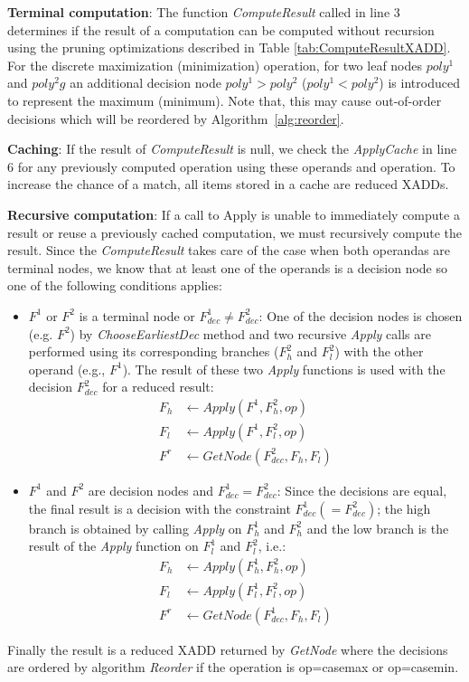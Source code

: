 \documentclass[twoside,11pt]{article}
\begin{document}
\textbf{Terminal computation}: 
The function \emph{ComputeResult} called in line 3 determines if the result of a computation can be computed without recursion using the pruning optimizations described in Table \ref{tab:ComputeResultXADD}. For the discrete maximization (minimization) operation, for two leaf nodes $poly^1$ and $poly^2g$ an additional decision node $poly^1 > poly^2$ ($poly^1 < poly^2$) is introduced to represent the maximum (minimum). Note that, this may cause out-of-order decisions which will be reordered by Algorithm~\ref{alg:reorder}. 

\textbf{Caching}:
If the result of \emph{ComputeResult} is null, we check the \emph{ApplyCache} in line 6 for any previously computed operation using these operands and operation. To increase the chance of a match, all items stored in a cache are reduced XADDs.

\textbf{Recursive computation}:
If a call to Apply is unable to immediately compute a result or reuse a previously cached computation, we must recursively compute the result. Since the \emph{ComputeResult} takes care of the case when both operandas are terminal nodes, we know that at least one of the operands is a decision node so one of the following conditions applies: 
\begin{itemize}
\item $F^1$ or $F^2$ is a terminal node or $\mathit{F^1_{dec}}\neq \mathit{F^2_{dec}} $: One of the decision nodes is chosen (e.g. $F^2$) by 
\emph{ChooseEarliestDec} method and two recursive \emph{Apply} calls are performed using its corresponding branches ($F^2_{h}$ and 
$F^2_{l}$) with the other operand (e.g., $F^1$).
The result of these two \emph{Apply} functions is used with the decision $\mathit{F^2_{dec}}$ for a reduced result:
\begin{align*}
F_h & \leftarrow Apply (F^1 , F^2_{h},op) \\
F_l & \leftarrow Apply (F^1 , F^2_{l},op)  \\
F^r & \leftarrow GetNode (\mathit{F^2_{dec}} , F_h,F_l) 
\end{align*}
\item $F^1$ and $F^2$ are decision nodes and $\mathit{F^1_{dec}}=\mathit{F^2_{dec}} $: Since the decisions are equal, the final result is a decision with the constraint $\mathit{F^1_{dec}} (=\mathit{F^2_{dec}})$; the high branch is obtained by calling \emph{Apply} on $F_h^1$ and $F_h^2$ and the low branch is the result of the \emph{Apply} function on $F_l^1$ and $F_l^2$, i.e.:
\begin{align*}
F_h & \leftarrow Apply (F^1_{h} , F^2_{h},op)  \\
F_l & \leftarrow Apply (F^1_{l} , F^2_{l},op)  \\
F^r & \leftarrow GetNode (\mathit{F^1_{dec}} , F_h,F_l) 
\end{align*}
\end{itemize}
Finally the result is a reduced XADD returned by \emph{GetNode} where the decisions are ordered by algorithm \emph{Reorder} if the operation is op=casemax or op=casemin. 
\end{document}
